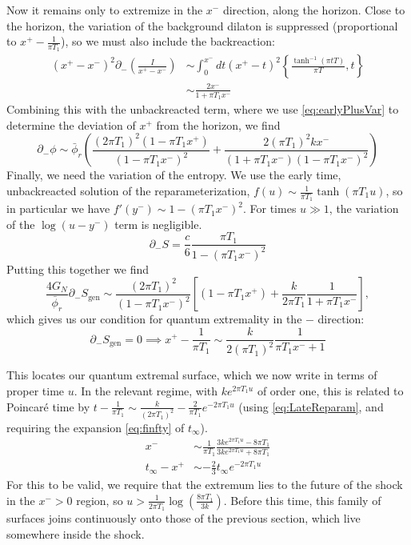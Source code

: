 \documentclass[12pt]{article}
\begin{document}
Now it remains only to extremize in the $x^-$ direction, along the horizon. Close to the horizon, the variation of the background dilaton is suppressed (proportional to $x^+-\frac{1}{\pi T_1}$), so we must also include the backreaction:
\begin{equation}
\begin{aligned}
	(x^+-x^-)^2 \partial_- \left(\frac{I}{x^+-x^-}\right) &\sim \int_0^{x^-} dt(x^+-t)^2 \left\{ \frac{\tanh ^{-1}(\pi  t T)}{\pi  T},t \right\} \\
	& \sim \frac{2x^-}{1+\pi T_1 x^-}
\end{aligned}
\end{equation}
Combining this with the unbackreacted term, where we use \eqref{eq:earlyPlusVar} to determine the deviation of $x^+$ from the horizon, we find
\begin{equation}
	\partial_- \phi \sim \bar{\phi}_r \left(\frac{(2\pi T_1)^2(1 - \pi T_1 x^+)}{(1-\pi T_1 x^-)^2}+ \frac{2 (\pi T_1)^2kx^-}{(1+\pi T_1 x^-)(1-\pi T_1 x^-)^2}\right)
\end{equation}
Finally, we need the variation of the entropy. We use the early time, unbackreacted solution of the reparameterization, $f(u)\sim \frac{1}{\pi T_1} \tanh(\pi T_1 u)$, so in particular we have $f'(y^-)\sim 1-(\pi T_1 x^-)^2$. For times $u\gg 1$, the variation of the $\log(u-y^-)$ term is negligible.
\begin{equation}
	\partial_- S = \frac{c}{6} \frac{\pi T_1}{1-(\pi T_1 x^-)^2} %
\end{equation}
Putting this together we find
\begin{equation}
	\frac{4G_N}{\bar{\phi}_r}\partial_- S_\text{gen} \sim  \frac{(2\pi T_1)^2}{(1-\pi T_1 x^-)^2}\left[(1-\pi T_1 x^+)+\frac{k}{2\pi T_1}\frac{1}{1+\pi T_1 x^- }\right],
\end{equation}
which gives us our condition for quantum extremality in the $-$ direction:
\begin{equation}
	\partial_- S_\text{gen}=0 \implies x^+ -\frac{1}{\pi T_1} \sim \frac{k}{2(\pi T_1)^2} \frac{1}{\pi T_1 x^-+1}
\end{equation}

This locates our quantum extremal surface, which we now write in terms of proper time $u$. In the relevant regime, with $ke^{2\pi T_1 u}$ of order one, this is related to Poincar\'e time by $t-\frac{1}{\pi T_1}\sim \frac{k}{(2\pi T_1)^2}- \frac{2}{\pi T_1} e^{-2\pi T_1 u}$ (using \eqref{eq:LateReparam}, and requiring the expansion \eqref{eq:finfty} of $t_\infty$).
\begin{align}
	x^- &\sim \frac{1}{\pi T_1} \frac{3k e^{2\pi T_1 u}-8\pi T_1}{3k e^{2\pi T_1 u}+8\pi T_1} \\
	t_\infty - x^+  &\sim  -\frac{2}{3}t_\infty e^{-2\pi T_1 u}
\end{align}
For this to be valid, we require that the extremum lies to the future of the shock in the $x^->0$ region, so $u>\frac{1}{2\pi T_1} \log\left(\frac{8\pi T_1}{3k}\right)$. Before this time, this family of surfaces joins continuously onto those of the previous section, which live somewhere inside the shock.
\end{document}
